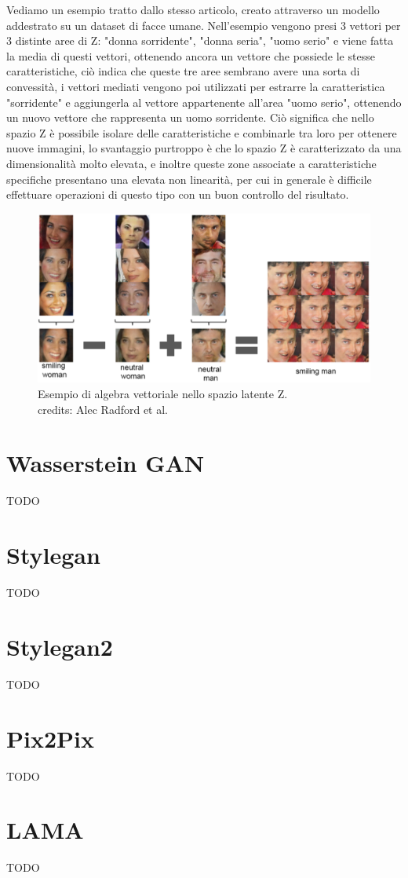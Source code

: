 Vediamo un esempio tratto dallo stesso articolo, creato attraverso un modello addestrato su un dataset di facce umane.
Nell'esempio vengono presi 3 vettori per 3 distinte aree di Z: "donna sorridente", "donna seria", "uomo serio" e viene fatta la media 
di questi vettori, ottenendo ancora un vettore che possiede le stesse caratteristiche, ciò indica che queste tre aree sembrano avere una sorta di 
convessità, i vettori mediati vengono poi utilizzati per estrarre la caratteristica "sorridente" e aggiungerla al vettore appartenente all'area "uomo serio",
ottenendo un nuovo vettore che rappresenta un uomo sorridente.
Ciò significa che nello spazio Z è possibile isolare delle caratteristiche e combinarle tra loro per ottenere nuove immagini, lo svantaggio purtroppo
è che lo spazio Z è caratterizzato da una dimensionalità molto elevata, e inoltre queste zone associate a caratteristiche specifiche presentano una elevata
non linearità, per cui in generale è difficile effettuare operazioni di questo tipo con un buon controllo del risultato.

    \begin{figure}[H]
        \centering
        \includegraphics[width=1.0\textwidth]{imgs/DCGAN_vectorial_algebra.png}
        \caption{Esempio di algebra vettoriale nello spazio latente Z.\\
        credits: Alec Radford et al. \cite{radford2016unsupervised}}
        \label{fig:DCGAN_vectorial_algebra}
    \end{figure}

\section{Wasserstein GAN}
TODO

\section{Stylegan}
TODO

\section{Stylegan2}
TODO

\section{Pix2Pix}
TODO

\section{LAMA}
TODO


